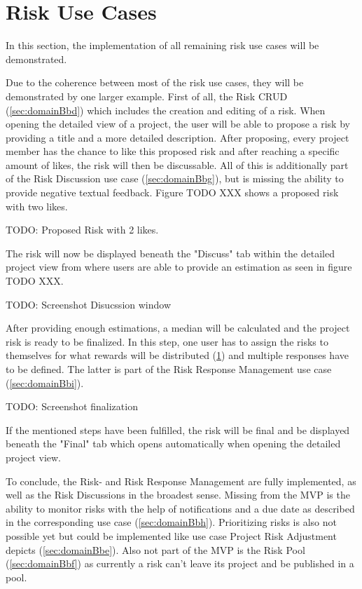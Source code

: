 
\section{Risk Use Cases}
\label{sec:implementationRisks}

In this section, the implementation of all remaining risk use cases will be demonstrated.

Due to the coherence between most of the risk use cases, they will be demonstrated by one larger example. First of all, the Risk CRUD (\ref{sec:domainBbd}) which includes the creation and editing of a risk. When opening the detailed view of a project, the user will be able to propose a risk by providing a title and a more detailed description. After proposing, every project member has the chance to like this proposed risk and after reaching a specific amount of likes, the risk will then be discussable. All of this is additionally part of the Risk Discussion use case (\ref{sec:domainBbg}), but is missing the ability to provide negative textual feedback. Figure TODO XXX shows a proposed risk with two likes.

TODO: Proposed Risk with 2 likes.


The risk will now be displayed beneath the "Discuss" tab within the detailed project view from where users are able to provide an estimation as seen in figure TODO XXX.

TODO: Screenshot Disucssion window

After providing enough estimations, a median will be calculated and the project risk is ready to be finalized. In this step, one user has to assign the risks to themselves for what rewards will be distributed (\ref{sec:implementationRisks}) and multiple responses have to be defined. The latter is part of the Risk Response Management use case (\ref{sec:domainBbi}).

TODO: Screenshot finalization

If the mentioned steps have been fulfilled, the risk will be final and be displayed beneath the "Final" tab which opens automatically when opening the detailed project view.

To conclude, the Risk- and Risk Response Management are fully implemented, as well as the Risk Discussions in the broadest sense. Missing from the MVP is the ability to monitor risks with the help of notifications and a due date as described in the corresponding use case (\ref{sec:domainBbh}). Prioritizing risks is also not possible yet but could be implemented like use case Project Risk Adjustment depicts (\ref{sec:domainBbe}). Also not part of the MVP is the Risk Pool (\ref{sec:domainBbf}) as currently a risk can’t leave its project and be published in a pool.
